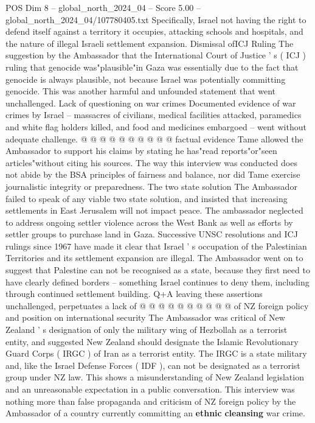 \begin{textsample}{POS Dim 8 – global\_north\_2024\_04 – Score 5.00 – global\_north\_2024\_04/107780405.txt}
Specifically, Israel not having the right to defend itself against a territory it occupies, attacking schools and hospitals, and the nature of illegal Israeli settlement expansion.
Dismissal ofICJ Ruling The suggestion by the Ambassador that the International Court of Justice ' s ( ICJ ) ruling that genocide was"plausible"in Gaza was essentially due to the fact that genocide is always plausible, not because Israel was potentially committing genocide.
This was another harmful and unfounded statement that went unchallenged.
Lack of questioning on war crimes Documented evidence of war crimes by Israel -- massacres of civilians, medical facilities attacked, paramedics and white flag holders killed, and food and medicines embargoed -- went without adequate challenge. @ @ @ @ @ @ @ @ @ @ factual evidence Tame allowed the Ambassador to support his claims by stating he has"read reports"or"seen articles"without citing his sources.
The way this interview was conducted does not abide by the BSA principles of fairness and balance, nor did Tame exercise journalistic integrity or preparedness.
The two state solution The Ambassador failed to speak of any viable two state solution, and insisted that increasing settlements in East Jerusalem will not impact peace.
The ambassador neglected to address ongoing settler violence across the West Bank as well as efforts by settler groups to purchase land in Gaza.
Successive UNSC resolutions and ICJ rulings since 1967 have made it clear that Israel ' s occupation of the Palestinian Territories and its settlement expansion are illegal.
The Ambassador went on to suggest that Palestine can not be recognised as a state, because they first need to have clearly defined borders -- something Israel continues to deny them, including through continued settlement building.
Q+A leaving these assertions unchallenged, perpetuates a lack of @ @ @ @ @ @ @ @ @ @ of NZ foreign policy and position on international security The Ambassador was critical of New Zealand ' s designation of only the military wing of Hezbollah as a terrorist entity, and suggested New Zealand should designate the Islamic Revolutionary Guard Corps ( IRGC ) of Iran as a terrorist entity.
The IRGC is a state military and, like the Israel Defense Forces ( IDF ), can not be designated as a terrorist group under NZ law.
This shows a misunderstanding of New Zealand legislation and an unreasonable expectation in a public conversation.
This interview was nothing more than false propaganda and criticism of NZ foreign policy by the Ambassador of a country currently committing an \textbf{ethnic} \textbf{cleansing} war crime.

\end{textsample}
